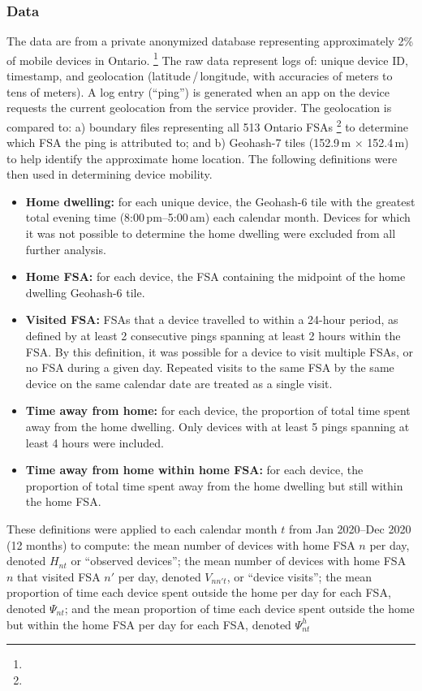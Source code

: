 \subsubsection{Data}\label{app.mob.data}
The data are from a private anonymized database representing
approximately 2\% of mobile devices in Ontario.%
\footnote{}
The raw data represent logs of: unique device ID, timestamp, and geolocation
(latitude\,/\,longitude, with accuracies of meters to tens of meters).
A log entry (``ping'') is generated when an app on the device
requests the current geolocation from the service provider.
The geolocation is compared to:
a) boundary files representing all 513 Ontario FSAs%
\footnote{}
to determine which FSA the ping is attributed to; and
b) Geohash-7 tiles (152.9\,m $\times$ 152.4\,m)
to help identify the approximate home location.
The following definitions were then used in determining device mobility.
\begin{itemize}
  \item \textbf{Home dwelling:} for each unique device, the Geohash-6 tile with
  the greatest total evening time (8:00\,pm--5:00\,am) each calendar month.
  Devices for which it was not possible to determine the home dwelling
  were excluded from all further analysis.
  \item \textbf{Home FSA:} for each device, the FSA containing
  the midpoint of the home dwelling Geohash-6 tile.
  \item \textbf{Visited FSA:} FSAs that a device travelled to within a 24-hour period,
  as defined by at least 2 consecutive pings spanning at least 2 hours within the FSA.
  By this definition, it was possible for a device to visit
  multiple FSAs, or no FSA during a given day.
  Repeated visits to the same FSA by the same device on the same calendar date
  are treated as a single visit.
  \item \textbf{Time away from home:} for each device,
  the proportion of total time spent away from the home dwelling.
  Only devices with at least 5 pings spanning at least 4 hours were included.
  \item \textbf{Time away from home within home FSA:} for each device,
  the proportion of total time spent away from the home dwelling but still within the home FSA.
\end{itemize}
\par
These definitions were applied to each calendar month $t$ from Jan 2020--Dec 2020 (12 months) to compute:
the mean number of devices with home FSA $n$ per day, denoted $H_{nt}$ or ``observed devices'';
the mean number of devices with home FSA $n$ that visited FSA $n'$ per day, denoted $V_{nn't}$, or ``device visits'';
the mean proportion of time each device spent outside the home per day for each FSA, denoted $\Psi_{nt}$; and
the mean proportion of time each device spent outside the home but within the home FSA per day for each FSA, denoted $\Psi^h_{nt}$

